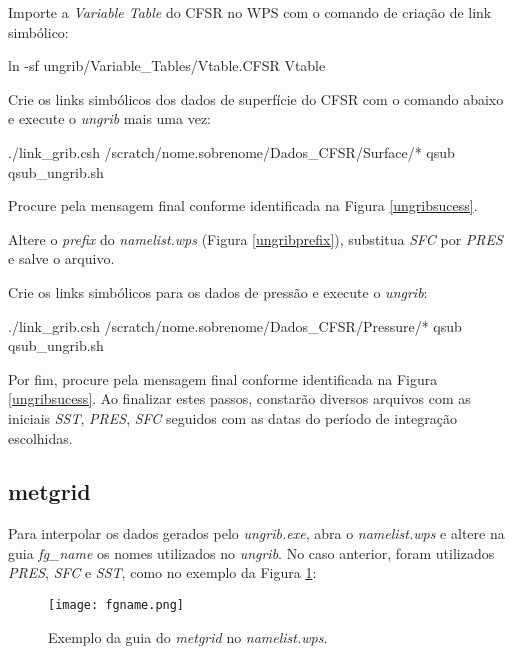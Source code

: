 \noindent Importe a \textit{Variable Table} do CFSR no WPS com o comando de criação de link simbólico:
\bigskip

\begin{bashcode}
ln -sf ungrib/Variable_Tables/Vtable.CFSR Vtable
\end{bashcode}
\bigskip

\noindent Crie os links simbólicos dos dados de superfície do CFSR com o comando abaixo e execute o \textit{ungrib} mais uma vez:
\bigskip

\begin{bashcode}
./link_grib.csh /scratch/nome.sobrenome/Dados_CFSR/Surface/*
qsub qsub_ungrib.sh
\end{bashcode}
\bigskip

\noindent Procure pela mensagem final conforme identificada na Figura \textcolor{bleu_cite}{\ref{ungribsucess}}.
\bigskip

\noindent Altere o \textit{prefix} do \textit{namelist.wps} (Figura \textcolor{bleu_cite}{\ref{ungribprefix}}), substitua \textit{SFC} por \textit{PRES} e salve o arquivo.
\bigskip

\noindent Crie os links simbólicos para os dados de pressão e execute o \textit{ungrib}:
\bigskip

\begin{bashcode}
./link_grib.csh /scratch/nome.sobrenome/Dados_CFSR/Pressure/*
qsub qsub_ungrib.sh
\end{bashcode}
\bigskip

\noindent Por fim, procure pela mensagem final conforme identificada na Figura \textcolor{bleu_cite}{\ref{ungribsucess}}. Ao finalizar estes passos, constarão diversos arquivos com as iniciais \textit{SST}, \textit{PRES}, \textit{SFC} seguidos com as datas do período de integração escolhidas.
\bigskip




\subsection{metgrid}
\bigskip
\noindent Para interpolar os dados gerados pelo \textit{ungrib.exe},  abra o \textit{namelist.wps} e altere na guia \textit{fg\_name} os nomes utilizados no \textit{ungrib}. No caso anterior, foram utilizados \textit{PRES}, \textit{SFC} e \textit{SST}, como no exemplo da Figura \textcolor{bleu_cite}{\ref{fgname}}:
\bigskip

\begin{figure}[H]
    \centering
    \texttt{[image: fgname.png]}
    \caption{Exemplo da guia do \textit{metgrid} no \textit{namelist.wps}.}
    \label{fgname}
\end{figure}
\bigskip

